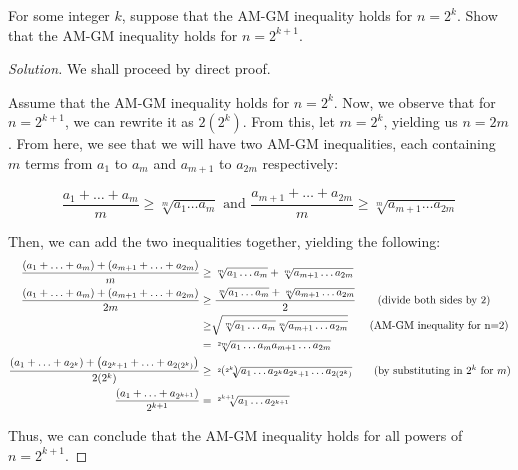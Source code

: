 \documentclass{article}
\newenvironment{solution}{\begin{proof}[Solution]}{\end{proof}}
\begin{document}
\begin{hw}
	For some integer $k$, suppose that the AM-GM inequality holds for $n=2^{k}$. Show that the AM-GM inequality holds for $n=2^{k+1}$.
\end{hw}
\begin{solution}
	We shall proceed by direct proof.
	
	Assume that the AM-GM inequality holds for $n=2^{k}$. Now, we observe that for $n=2^{k+1}$, we can rewrite it as $2\left( 2^{k} \right)$. From this, let $m=2^{k}$, yielding us $n=2m$. From here, we see that we will have two AM-GM inequalities, each containing $m$ terms from $a_{1}$ to $a_{m}$ and $a_{m+1}$ to $a_{2m}$ respectively:
	
	\begin{equation*}
		\dfrac{a_{1}+\ldots+a_{m}}{m}\geq\sqrt[m]{a_{1}\ldots a_{m}}\text{ and }\dfrac{a_{m+1}+\ldots+a_{2m}}{m}\geq\sqrt[m]{a_{m+1}\ldots a_{2m}}
	\end{equation*}

	Then, we can add the two inequalities together, yielding the following:
	\begin{align*}
		 \dfrac{\left( a_{1}+\ldots+a_{m} \right)+\left( a_{m+1}+\ldots+a_{2m} \right)}{m} &\geq \sqrt[m]{a_{1}\ldots a_{m}} + \sqrt[m]{a_{m+1}\ldots a_{2m}} \\
		 \dfrac{\left( a_{1}+\ldots+a_{m} \right)+\left( a_{m+1}+\ldots+a_{2m} \right)}{2m} &\geq \dfrac{\sqrt[m]{a_{1}\ldots a_{m}} + \sqrt[m]{a_{m+1}\ldots a_{2m}}}{2} \tag{divide both sides by $2$} \\
		 &\geq \sqrt[]{\sqrt[m]{a_{1}\ldots a_{m}}\sqrt[m]{a_{m+1} \ldots a_{2m}}} \tag{AM-GM inequality for n=2} \\
		 &= \sqrt[2m]{a_{1} \ldots a_{m}a_{m+1} \ldots a_{2m}}\\
		  \dfrac{\left( a_{1}+\ldots+a_{2^{k}} \right)+\left( a_{2^{k}+1}+\ldots+a_{2(2^{k})} \right)}{2(2^{k})} &\geq \sqrt[2\left( 2^{k} \right)]{a_{1}\ldots a_{2^{k}}a_{2^{k}+1}\ldots a_{2\left( 2^{k} \right)}} \tag{by substituting in $2^{k}$ for $m$} \\
		  \dfrac{\left( a_{1}+\ldots+a_{2^{k+1}} \right)}{2^{k+1}} &= \sqrt[2^{k+1}]{a_{1} \ldots a_{2^{k+1}}}
	\end{align*}

	Thus, we can conclude that the AM-GM inequality holds for all powers of $n=2^{k+1}$.
\end{solution}
\end{document}
